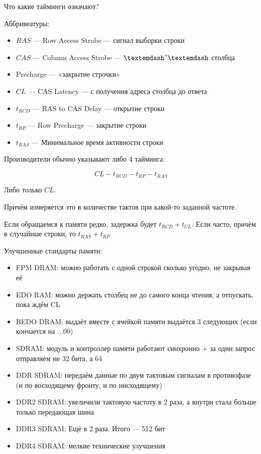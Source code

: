 \documentclass[12pt, a4paper]{article}
\begin{document}
Что какие тайминги означают?

Аббривеатуры: 
\begin{itemize}
    \item $RAS$ — Row Access Strobe — сигнал выборки строки
    \item $CAS$ — Column Access Strobe — $—"—$ столбца
    \item Precharge — «закрытие строчки»
\end{itemize}

\begin{itemize}
    \item $CL$ — CAS Latency — с получения адреса столбца до ответа
    \item $t_{RCD}$ — RAS to CAS Delay — открытие строки
    \item $t_{RP}$ — Row Precharge — закрытие строки
    \item $t_{RAS}$ — Минимальное время активности строки
\end{itemize}


Производители обычно указывают либо 4 тайминга:

\begin{equation*}
    CL - t_{RCD} - t_{RP} - t_{RAS}
\end{equation*}

Либо только $CL$.

Причём измеряется это в количестве тактов при какой-то заданной частоте.

Если обращаемся к памяти редко, задержка будет $t_{RCD} + t_{CL}$.
Если часто, причём в случайные строки, то $t_{RAS} + t_{RP}$

Улучшенные стандарты памяти: 
\begin{itemize}
    \item FPM DRAM: можно работать с одной строкой сколько угодно, не закрывая её
    \item EDO RAM: можно держать столбец не до самого конца чтения, а отпускать, пока ждём CL
    \item BEDO DRAM: выдаёт вместе с ячейкой памяти выдаётся 3 следующих (если кончается на $…00$)
    \item SDRAM: модуль и контроллер памяти работают синхронно + за один запрос отправляем не 32 бита, а 64
    \item DDR SDRAM: передаём данные по двум тактовым сигналам в противофазе (и по восходящему фронту, и по нисходящему)
    \item DDR2 SDRAM: увеличили тактовую частоту в 2 раза, а внутри стала больше только передающая шина
    \item DDR3 SDRAM: Ещё в 2 раза. Итого — 512 бит
    \item DDR4 SDRAM: мелкие технические улучшения
\end{itemize}
\end{document}

